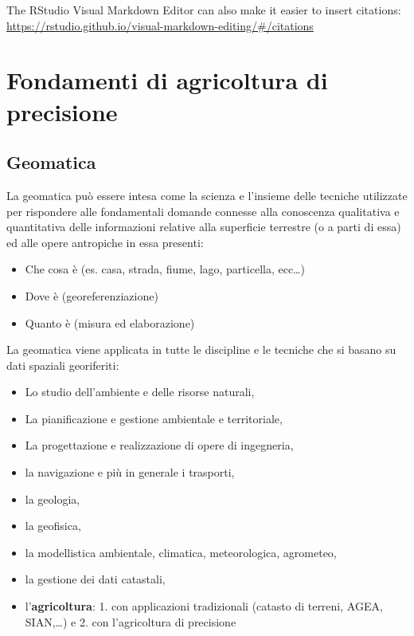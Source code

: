 \documentclass[
]{book}
\providecommand{\tightlist}{%
  \setlength{\itemsep}{0pt}\setlength{\parskip}{0pt}}
\theoremstyle{definition}
\theoremstyle{definition}
\theoremstyle{definition}
\theoremstyle{definition}
\theoremstyle{remark}
\begin{document}
The RStudio Visual Markdown Editor can also make it easier to insert citations: \url{https://rstudio.github.io/visual-markdown-editing/\#/citations}

\hypertarget{fondamenti-di-agricoltura-di-precisione}{%
\chapter{Fondamenti di agricoltura di precisione}\label{fondamenti-di-agricoltura-di-precisione}}

\hypertarget{geomatica}{%
\section{Geomatica}\label{geomatica}}

La geomatica può essere intesa come la scienza e l'insieme delle tecniche utilizzate per rispondere alle fondamentali domande connesse alla conoscenza qualitativa e quantitativa delle informazioni relative alla superficie terrestre (o a parti di essa) ed alle opere antropiche in essa presenti:

\begin{itemize}
\item
  Che cosa è (es. casa, strada, fiume, lago, particella, ecc\ldots)
\item
  Dove è (georeferenziazione)
\item
  Quanto è (misura ed elaborazione)
\end{itemize}

La geomatica viene applicata in tutte le discipline e le tecniche che si basano su dati spaziali georiferiti:

\begin{itemize}
\tightlist
\item
  Lo studio dell'ambiente e delle risorse naturali,
\item
  La pianificazione e gestione ambientale e territoriale,
\item
  La progettazione e realizzazione di opere di ingegneria,
\item
  la navigazione e più in generale i trasporti,
\item
  la geologia,
\item
  la geofisica,
\item
  la modellistica ambientale, climatica, meteorologica, agrometeo,
\item
  la gestione dei dati catastali,
\item
  l'\textbf{agricoltura}: 1. con applicazioni tradizionali (catasto di terreni, AGEA, SIAN,\ldots) e 2. con l'agricoltura di precisione
\end{itemize}
\end{document}
